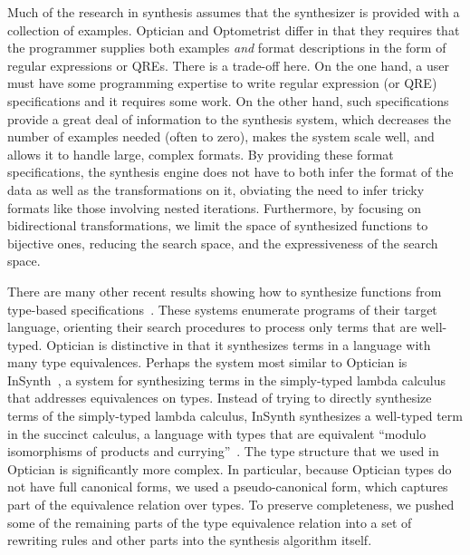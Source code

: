 \documentclass[acmsmall,review,anonymous]{acmart}\settopmatter{printfolios=true,printccs=false,printacmref=false}
\begin{document}
Much of the research in synthesis assumes that the synthesizer is provided with
a collection of examples. Optician and Optometrist differ in that they requires
that the programmer supplies both examples {\em and} format descriptions in the
form of regular expressions or QREs.  There is a trade-off here.  On the one
hand, a user must have some programming expertise to write regular expression
(or QRE) specifications and it requires some work. On the other hand, such
specifications provide a great deal of information to the synthesis system,
which decreases the number of examples needed (often to zero), makes the system
scale well, and allows it to handle large, complex formats.  By providing these
format specifications, the synthesis engine does not have to both infer the
format of the data as well as the transformations on it, obviating the need to
infer tricky formats like those involving nested iterations. Furthermore, by
focusing on bidirectional transformations, we limit the space of synthesized
functions to bijective ones, reducing the search space, and the expressiveness
of the search space.

There are many other recent results showing how to synthesize functions from
type-based
specifications~\cite{augustsson-2004,osera+:pldi15,feser-pldi-2015,scherer-icfp-2015,frankle+:popl16,armando+:pldi16}.
These systems enumerate programs of their target language, orienting their
search procedures to process only terms that are well-typed.
Optician is distinctive in that it synthesizes terms in a language with many
type equivalences.
Perhaps the system most similar to Optician is InSynth~\cite{gvero-pldi-2013}, a
system for synthesizing terms in the simply-typed lambda calculus that addresses
equivalences on types. Instead of trying to directly synthesize terms of the
simply-typed lambda calculus, InSynth synthesizes a well-typed term
in the succinct calculus, a language with types
that are equivalent ``modulo isomorphisms of products and
currying''~\cite{gvero-pldi-2013}. The type structure that we used in Optician
is significantly more complex.  In particular, because Optician types do not
have full canonical forms, we used a pseudo-canonical form, which captures part
of the equivalence relation over types. To preserve completeness, we pushed
some of the remaining parts of the type equivalence relation into a set of
rewriting rules and other parts into the synthesis algorithm itself.
\end{document}
